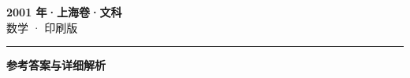 \documentclass[zihao=5, a4paper]{ctexart}
\begin{document}
\begin{center}
  {\Large\bfseries 2001 年·上海卷·文科}\\[4pt]
  {\large 数学 · 印刷版}
\end{center}
\medskip
{}

\par\bigskip\hrule\bigskip
{}
\begin{center}{\large\bfseries 参考答案与详细解析}\end{center}
\smallskip

\end{document}
